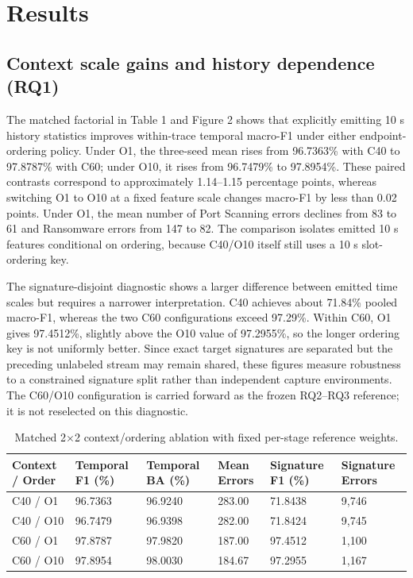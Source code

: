 \documentclass[final,3p,10pt,nopreprintline]{elsarticle}
\begin{document}
\section{Results}

\subsection{Context scale gains and history dependence (RQ1)}

The matched factorial in Table 1 and Figure 2 shows that explicitly emitting 10 s history statistics improves within-trace temporal macro-F1 under either endpoint-ordering policy. Under O1, the three-seed mean rises from 96.7363\% with C40 to 97.8787\% with C60; under O10, it rises from 96.7479\% to 97.8954\%. These paired contrasts correspond to approximately 1.14--1.15 percentage points, whereas switching O1 to O10 at a fixed feature scale changes macro-F1 by less than 0.02 points. Under O1, the mean number of Port Scanning errors declines from 83 to 61 and Ransomware errors from 147 to 82. The comparison isolates emitted 10 s features conditional on ordering, because C40/O10 itself still uses a 10 s slot-ordering key.

The signature-disjoint diagnostic shows a larger difference between emitted time scales but requires a narrower interpretation. C40 achieves about 71.84\% pooled macro-F1, whereas the two C60 configurations exceed 97.29\%. Within C60, O1 gives 97.4512\%, slightly above the O10 value of 97.2955\%, so the longer ordering key is not uniformly better. Since exact target signatures are separated but the preceding unlabeled stream may remain shared, these figures measure robustness to a constrained signature split rather than independent capture environments. The C60/O10 configuration is carried forward as the frozen RQ2--RQ3 reference; it is not reselected on this diagnostic.

\begin{table}[H]\centering\small\setlength{\tabcolsep}{3pt}\renewcommand{\arraystretch}{1.13}
\caption{Matched 2\(\times\)2 context/ordering ablation with fixed per-stage reference weights.}\label{tab:factorial}
\begin{tabular}{L{0.18\dimexpr{}\tabcolsep\relax}L{0.16\dimexpr{}\tabcolsep\relax}L{0.16\dimexpr{}\tabcolsep\relax}L{0.14\dimexpr{}\tabcolsep\relax}L{0.18\dimexpr{}\tabcolsep\relax}L{0.18\dimexpr{}\tabcolsep\relax}}\toprule
\textbf{Context / Order} & \textbf{Temporal F1 (\%)} & \textbf{Temporal BA (\%)} & \textbf{Mean Errors} & \textbf{Signature F1 (\%)} & \textbf{Signature Errors}\\\midrule
C40 / O1 & 96.7363 & 96.9240 & 283.00 & 71.8438 & 9,746\\
C40 / O10 & 96.7479 & 96.9398 & 282.00 & 71.8424 & 9,745\\
C60 / O1 & 97.8787 & 97.9820 & 187.00 & 97.4512 & 1,100\\
C60 / O10 & 97.8954 & 98.0030 & 184.67 & 97.2955 & 1,167\\
\bottomrule\end{tabular}
\end{table}
\end{document}
